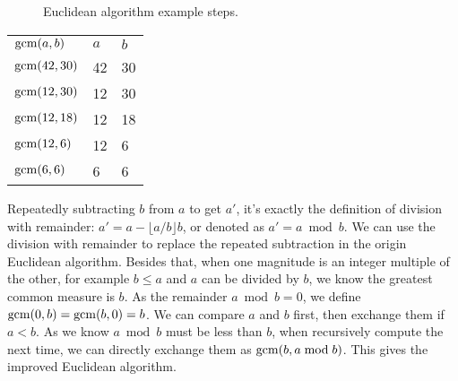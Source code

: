 \documentclass{article}
\begin{document}
\begin{figure}[htbp]
\centering
{}
\caption{Euclidean algorithm example steps.}
\label{fig:line-seg-gcm}
\end{figure}

\vspace{5mm}

\begin{tabular}{|l|l|l|}
\hline
$\operatorname{gcm}(a, b)$ & $a$ & $b$ \\
\hhline{|=|=|=|}
$\operatorname{gcm}(42, 30)$ & 42 & 30 \\
\hline
$\operatorname{gcm}(12, 30)$ & 12 & 30 \\
\hline
$\operatorname{gcm}(12, 18)$ & 12 & 18 \\
\hline
$\operatorname{gcm}(12, 6)$ & 12 & 6 \\
\hline
$\operatorname{gcm}(6, 6)$ & 6 & 6 \\
\hline
\end{tabular}

\vspace{5mm}

Repeatedly subtracting $b$ from $a$ to get $a'$, it's exactly the definition of division with remainder: $a' = a - \lfloor a / b \rfloor b$, or denoted as $a'= a \bmod b$. We can use the division with remainder to replace the repeated subtraction in the origin Euclidean algorithm. Besides that, when one magnitude is an integer multiple of the other, for example $b \leq a$ and $a$ can be divided by $b$, we know the greatest common measure is $b$. As the remainder $a \bmod b = 0$, we define $\operatorname{gcm}(0, b) = \operatorname{gcm}(b, 0) = b$. We can compare $a$ and $b$ first, then exchange them if $a < b$. As we know $a \bmod b$ must be less than $b$, when recursively compute the next time, we can directly exchange them as $\operatorname{gcm}(b, a \bmod b)$. This gives the improved Euclidean algorithm.
\end{document}
